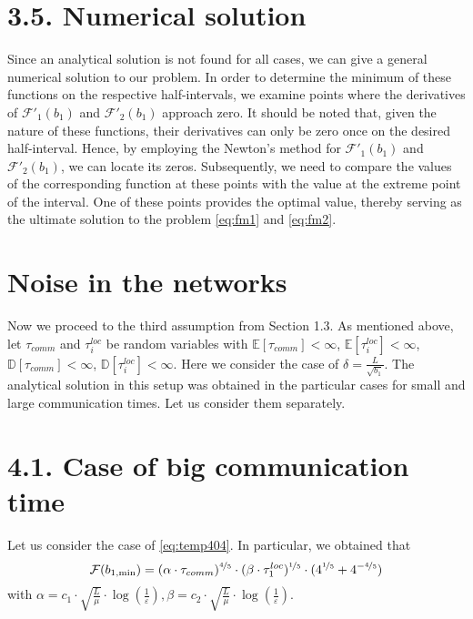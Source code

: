 \documentclass{article}
\theoremstyle{definition}
\theoremstyle{plain}
\begin{document}
\section*{3.5. Numerical solution}\label{eq:3.5}

Since an analytical solution is not found for all cases, we can give a general numerical solution to our problem. In order to determine the minimum of these functions on the respective half-intervals, we examine points where the derivatives of $\mathcal{F'}_1(b_1)$ and $\mathcal{F'}_2(b_1)$ approach zero. It should be noted that, given the nature of these functions, their derivatives can only be zero once on the desired half-interval. Hence, by employing the Newton's method \cite{polyak2007newton} for $\mathcal{F'}_1(b_1)$ and $\mathcal{F'}_2(b_1)$, we can locate its zeros. Subsequently, we need to compare the values of the corresponding function at these points with the value at the extreme point of the interval. One of these points provides the optimal value, thereby serving as the ultimate solution to the problem \eqref{eq:fm1} and \eqref{eq:fm2}.

\section{Noise in the networks}

Now we proceed to the third assumption from Section 1.3. As mentioned above, let $\tau_{comm}$ and $\tau_i^{loc}$ be random variables with $\mathbb E [\tau_{comm}] < \infty$, $ \mathbb E [\tau_i^{loc}] < \infty$, $\mathbb D [\tau_{comm}] < \infty$, $\mathbb D [\tau_i^{loc}] < \infty$. Here we consider the case of $\delta = \frac{L}{\sqrt{b_1}}$. The analytical solution in this setup was obtained in the particular cases for small and large communication times. Let us consider them separately. 

\section*{4.1. Case of big communication time}\label{s:4.1}

Let us consider the case of \eqref{eq:temp404}. In particular, we obtained that
\begin{equation}
    \label{eq:17}
    \mathcal{F}(b_{1, {\min}}) = (\alpha\cdot\tau_{comm})^{\nicefrac{4}{5}}\cdot (\beta\cdot\tau_1^{loc})^{\nicefrac{1}{5}}\cdot(4^{\nicefrac{1}{5}} + 4^{-\nicefrac{4}{5}})
\end{equation}
with $\alpha = c_1\cdot\sqrt{\frac{L}{\mu}}\cdot \log(\frac{1}{\varepsilon}),\beta = c_2\cdot\sqrt{\frac{L}{\mu}}\cdot \log(\frac{1}{\varepsilon}) $.
\end{document}
